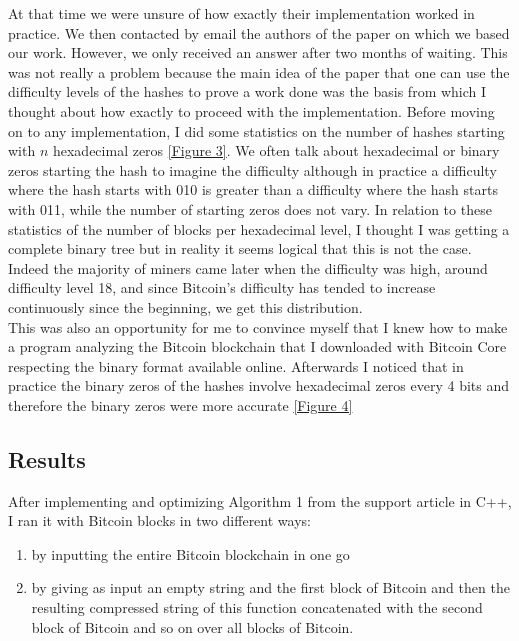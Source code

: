 \documentclass[12pt,a4paper]{article}
\newcommand{\annexe}[2]{\hyperlink{#1}{[Figure #2]}}
\begin{document}
	At that time we were unsure of how exactly their implementation worked in practice. We then contacted by email the authors of the paper on which we based our work. However, we only received an answer after two months of waiting. This was not really a problem because the main idea of the paper that one can use the difficulty levels of the hashes to prove a work done was the basis from which I thought about how exactly to proceed with the implementation. Before moving on to any implementation, I did some statistics on the number of hashes starting with $n$ hexadecimal zeros \annexe{23}{3}. We often talk about hexadecimal or binary zeros starting the hash to imagine the difficulty although in practice a difficulty where the hash starts with 010 is greater than a difficulty where the hash starts with 011, while the number of starting zeros does not vary. In relation to these statistics of the number of blocks per hexadecimal level, I thought I was getting a complete binary tree but in reality it seems logical that this is not the case. Indeed the majority of miners came later when the difficulty was high, around difficulty level 18, and since Bitcoin's difficulty has tended to increase continuously since the beginning, we get this distribution.\\
This was also an opportunity for me to convince myself that I knew how to make a program analyzing the Bitcoin blockchain that I downloaded with Bitcoin Core respecting the binary format available online. Afterwards I noticed that in practice the binary zeros of the hashes involve hexadecimal zeros every 4 bits and therefore the binary zeros were more accurate \annexe{24}{4}
		
	\subsection{Results}
	
	After implementing and optimizing Algorithm 1 from the support article in C++, I ran it with Bitcoin blocks in two different ways:\\
	\begin{enumerate}
		\item by inputting the entire Bitcoin blockchain in one go\\
	  \item by giving as input an empty string and the first block of Bitcoin and then the resulting compressed string of this function concatenated with the second block of Bitcoin and so on over all blocks of Bitcoin.\\
	\end{enumerate}
	
\end{document}
